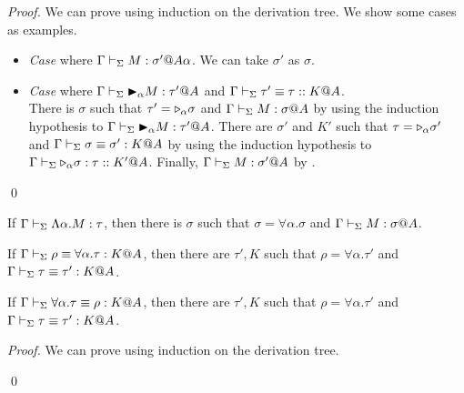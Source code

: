 \begin{proof}
	We can prove using induction on the derivation tree.
	We show some cases as examples.
				
\begin{itemize}
	\item \textit{Case} \TTB{} where \(\Gamma \vdash_\Sigma M : \sigma'@A\alpha\).
		  We can take $\sigma'$ as $\sigma$.	      	      		      	      	      	      	      
	\item \textit{Case} \TConv{} where \( \Gamma \vdash_\Sigma {\mathop{\blacktriangleright}}_\alpha M : \tau'@A \) and \( \Gamma\vdash_\Sigma\tau' \equiv \tau :: K@A \).\\
		  There is $\sigma$ such that $\tau' = {\mathop{\triangleright}}_\alpha \sigma$ and $\G \V M : \sigma@A$
		  by using the induction hypothesis to \( \Gamma \vdash_\Sigma {\mathop{\blacktriangleright}}_\alpha M : \tau' @A\).
		  There are $\sigma'$ and $K'$ such that $\tau = {\mathop{\triangleright}}_\alpha \sigma'$ and $\Gamma \vdash_\Sigma \sigma \equiv \sigma' : K @ A$
		  by using the induction hypothesis to \( \Gamma \vdash_\Sigma {\mathop{\triangleright}}_\alpha \sigma : \tau :: K' @A\).
		  Finally, $\Gamma \vdash_\Sigma M : \sigma' @ A $ by \TConv.
\end{itemize}
\qed\end{proof}	

\begin{lemma}
	\begin{item}
	      \item If $\Gamma \vdash_\Sigma \Lambda\alpha.M : \tau$, then 
	      there is $\sigma$ such that $\sigma = \forall\alpha.\sigma$ and $\G \V M : \sigma@A$.%
	      \item If $\Gamma \vdash_\Sigma \rho \equiv \forall\alpha.\tau : K @A$, then there are $\tau', K$ such that
	      $\rho = \forall\alpha.\tau'$ and $\Gamma \vdash_\Sigma \tau \equiv \tau' : K @A$.
	      \item If $\Gamma \vdash_\Sigma \forall\alpha.\tau \equiv \rho : K @A$, then there are $\tau', K$ such that
	      $\rho = \forall\alpha.\tau'$ and $\Gamma \vdash_\Sigma \tau \equiv \tau' : K @A$.
	\end{item}
\end{lemma}

\begin{proof}
	We can prove using induction on the derivation tree.
		
\qed\end{proof}
		
